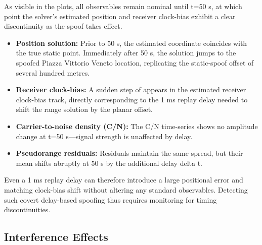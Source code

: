         \noindent As visible in the plots, all observables remain nominal until t=50 s, at which point the solver's estimated position and receiver clock-bias exhibit a clear discontinuity as the spoof takes effect.

        \begin{itemize}
            \item \textbf{Position solution:} Prior to 50 s, the estimated coordinate coincides with the true static point. Immediately after 50 s, the solution jumps to the spoofed Piazza Vittorio Veneto location, replicating the static-spoof offset of several hundred metres.  
            \item \textbf{Receiver clock-bias:} A sudden step of appears in the estimated receiver clock-bias track, directly corresponding to the 1 ms replay delay needed to shift the range solution by the planar offset.  
            \item \textbf{Carrier-to-noise density (C/N):} The C/N time-series shows no amplitude change at t=50 s—signal strength is unaffected by delay.  
            \item \textbf{Pseudorange residuals:} Residuals maintain the same spread, but their mean shifts abruptly at 50 s by the additional delay delta t.  
        \end{itemize}
        
        \noindent Even a 1 ms replay delay can therefore introduce a large positional error and matching clock-bias shift without altering any standard observables. Detecting such covert delay-based spoofing thus requires monitoring for timing discontinuities.

    \subsection{Interference Effects}
    

